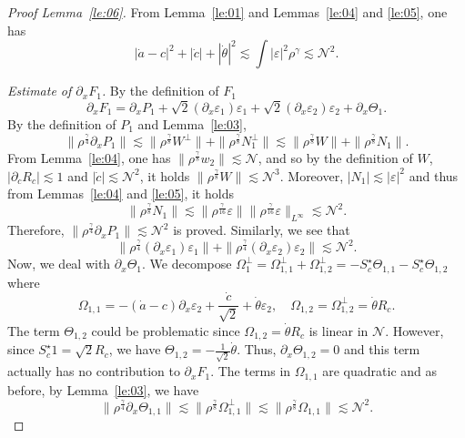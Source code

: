 \documentclass[11pt]{amsart}
\theoremstyle{remark}
\newcommand\cN{\mathcal{N}}
\newcommand\ep{\varepsilon}
\begin{document}
\begin{proof}[Proof Lemma~\ref{le:06}]
From Lemma~\ref{le:01} and Lemmas~\ref{le:04} and
\ref{le:05}, one has
\[
|\dot a-c|^2+|\dot c|+|\dot \theta|^2
\lesssim \int |\ep|^2 \rho^\gamma\lesssim \cN^2.
\]

\emph{Estimate of $\partial_x F_1$.}
By the definition of $F_1$
\[
\partial_x F_1 = \partial_x P_1 + \sqrt{2} (\partial_x \ep_1)\ep_1
+\sqrt{2} (\partial_x \ep_2)\ep_2 + \partial_x \Theta_1.
\]
By the definition of $P_1$ and Lemma~\ref{le:03},
\[
\|\rho^\frac\gamma4\partial_x P_1\|
\lesssim \|\rho^\frac\gamma8W^\perp\|+ \|\rho^\frac\gamma8N_1^\perp\|
\lesssim \|\rho^\frac\gamma8W\|+ \|\rho^\frac\gamma8N_1\|.
\]
From Lemma~\ref{le:04}, one has $\|\rho^\frac\gamma8 w_2\|\lesssim \cN$, and so
by the definition of $W$, $|\partial_c R_c|\lesssim 1$ and $|\dot c|\lesssim \cN^2$, it holds
$\|\rho^\frac\gamma8W\|\lesssim\cN^3$.
Moreover, $|N_1|\lesssim|\ep|^2$ and thus from Lemmas~\ref{le:04} and
\ref{le:05}, it holds
\[
\|\rho^\frac\gamma8N_1\|\lesssim \|\rho^\frac\gamma{16}\ep\|
\|\rho^\frac\gamma{16}\ep\|_{L^\infty}\lesssim \cN^2.
\]
Therefore, $\|\rho^\frac\gamma4\partial_x P_1\|\lesssim \cN^2$ is proved.
Similarly, we see that
\[
\|\rho^\frac\gamma4(\partial_x \ep_1)\ep_1\|
+\|\rho^\frac\gamma4(\partial_x \ep_2)\ep_2 \|
\lesssim \cN^2.
\]
Now, we deal with $\partial_x \Theta_1$.
We decompose
$\Omega_1^\perp=\Omega_{1,1}^\perp+\Omega_{1,2}^\perp
=-S_c^\star \Theta_{1,1}-S_c^\star\Theta_{1,2}$
where
\[
\Omega_{1,1}=-(\dot a -c)\partial_x\ep_2+\frac{\dot c}{\sqrt{2}}
+\dot\theta \ep_2 ,\quad
\Omega_{1,2}=\Omega_{1,2}^\perp=\dot\theta R_c.
\]
The term $\Theta_{1,2}$ could be problematic since $\Omega_{1,2}=\dot \theta R_c$ 
 is linear in $\cN$.
However, since $S_c^\star 1 = \sqrt{2}R_c$, we have $\Theta_{1,2}=-\frac1{\sqrt2}\dot \theta$.
Thus, $\partial_x \Theta_{1,2}=0$ and this term actually has no contribution to
$\partial_x F_1$. The terms in $\Omega_{1,1}$ are quadratic and as before, by Lemma~\ref{le:03}, we have
\[
\|\rho^\frac\gamma4\partial_x \Theta_{1,1}\|
\lesssim \|\rho^\frac\gamma8\Omega_{1,1}^\perp\|
\lesssim \|\rho^\frac\gamma8\Omega_{1,1}\|\lesssim \cN^2.
\]


\end{proof}
\end{document}
